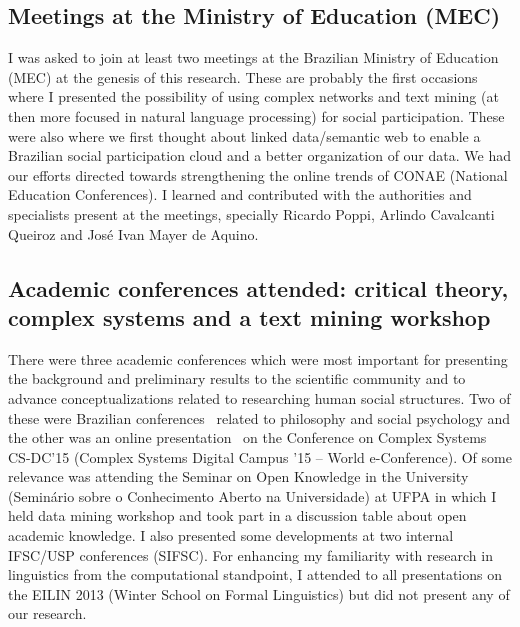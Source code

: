 \begin{apendicesenv}
\subsection{Meetings at the Ministry of Education (MEC)}
I was asked to join at least two meetings at the Brazilian Ministry of Education (MEC)
at the genesis of this research.
These are probably the first occasions where I presented the possibility of using
complex networks and text mining (at then more focused in natural language processing)
for social participation.
These were also where we first thought about linked data/semantic web to enable a
Brazilian social participation cloud and a better organization of our data.
We had our efforts directed towards strengthening the online trends of CONAE (National Education Conferences).
I learned and contributed with the authorities and specialists present at the meetings,
specially Ricardo Poppi, Arlindo Cavalcanti Queiroz and José Ivan Mayer de Aquino.

\subsection{Academic conferences attended: critical theory, complex systems and a text mining workshop}\label{ap:anphy}
There were three academic conferences
which were most important for presenting the background and preliminary results to the scientific community
and to advance conceptualizations related to researching human social structures.
Two of these were Brazilian conferences~\cite{50uni,IICri} related to philosophy and social psychology
and the other was an online presentation~\cite{ccs15} on the Conference on Complex Systems CS-DC'15
(Complex Systems Digital Campus ’15 – World e-Conference).
Of some relevance was attending the Seminar on Open Knowledge in the University
(Seminário sobre o Conhecimento Aberto na Universidade) at UFPA
in which I held data mining workshop and took part in a discussion table about open academic knowledge.
I also presented some developments at two internal IFSC/USP conferences (SIFSC).
For enhancing my familiarity with research in linguistics from the computational standpoint,
I attended to all presentations on the EILIN 2013 (Winter School on Formal Linguistics)
but did not present any of our research.


\end{apendicesenv}
